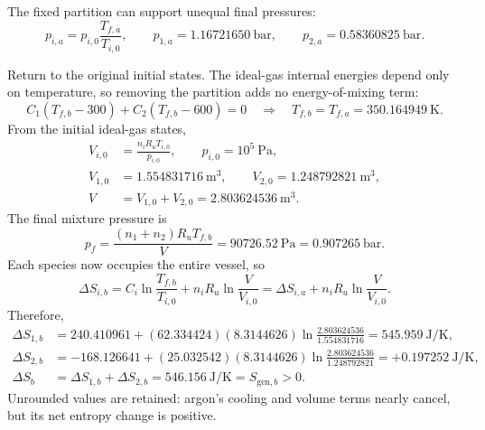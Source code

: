 The fixed partition can support unequal final pressures:
\[
p_{i,a}=p_{i,0}\frac{T_{f,a}}{T_{i,0}},\qquad
p_{1,a}=1.16721650~\mathrm{bar},\qquad
p_{2,a}=0.58360825~\mathrm{bar}.
\]

\newpage
{}
Return to the original initial states. The ideal-gas internal energies depend
only on temperature, so removing the partition adds no energy-of-mixing term:
\[
C_1(T_{f,b}-300)+C_2(T_{f,b}-600)=0
\quad\Longrightarrow\quad
\boxed{T_{f,b}=T_{f,a}=350.164949~\mathrm{K}}.
\]
From the initial ideal-gas states,
\begin{align*}
V_{i,0}&=\frac{n_iR_uT_{i,0}}{p_{i,0}},\qquad p_{i,0}=10^5~\mathrm{Pa},\\
V_{1,0}&=1.554831716~\mathrm{m^3},\qquad
V_{2,0}=1.248792821~\mathrm{m^3},\\
V&=V_{1,0}+V_{2,0}=2.803624536~\mathrm{m^3}.
\end{align*}
The final mixture pressure is
\[
p_f=\frac{(n_1+n_2)R_uT_{f,b}}{V}
=90726.52~\mathrm{Pa}
=\boxed{0.907265~\mathrm{bar}}.
\]
Each species now occupies the entire vessel, so
\[
\Delta S_{i,b}
=C_i\ln\frac{T_{f,b}}{T_{i,0}}+n_iR_u\ln\frac{V}{V_{i,0}}
=\Delta S_{i,a}+n_iR_u\ln\frac{V}{V_{i,0}}.
\]
Therefore,
\begin{align*}
\Delta S_{1,b}
&=240.410961+(62.334424)(8.3144626)\ln\frac{2.803624536}{1.554831716}
=\boxed{545.959~\mathrm{J/K}},\\
\Delta S_{2,b}
&=-168.126641+(25.032542)(8.3144626)\ln\frac{2.803624536}{1.248792821}
=\boxed{+0.197252~\mathrm{J/K}},\\
\Delta S_b&=\Delta S_{1,b}+\Delta S_{2,b}
=\boxed{546.156~\mathrm{J/K}}=S_{\mathrm{gen},b}>0.
\end{align*}
Unrounded values are retained: argon's cooling and volume terms nearly cancel,
but its net entropy change is positive.

